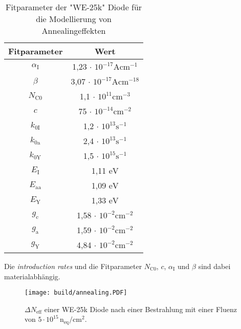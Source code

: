 \begin{table}
  \centering
  \caption{Fitparameter der "WE-25k" Diode für die Modellierung von Annealingeffekten }
  \label{tab:w1}
  \begin{tabular}{c c}
    \toprule
    Fitparameter & Wert  \\
    \midrule
        $\alpha_{\mathrm{I}}$  &    1,23 $\cdot$ $  10^{-17}        \mathrm{Acm^{-1}}$    \\
        $\beta $               &    3,07 $\cdot$ $10^{-17}          \mathrm{Acm^{-18}}$     \\
        $N_{\mathrm{C0}}$             &    1,1  $\cdot$            $10^{11}\mathrm{cm^{-3}}$   \\
        $c$                          &    75   $\cdot$             $10^{-14}\mathrm{cm^{-2}}$    \\
        $k_{0\mathrm{I}}$            &    1,2  $\cdot$             $10^{13}\mathrm{s^{-1}}$\\
        $k_{0\mathrm{a}}$           &    2,4  $\cdot$              $10^{13}\mathrm{s^{-1}}$   \\
        $k_{0\mathrm{Y}}$            &    1,5  $\cdot$             $10^{15}\mathrm{s^{-1}}$     \\
        $E_{\mathrm{I}}$                       &    1,11           $\mathrm{eV}$       \\
        $E_{\mathrm{aa}}$                     &    1,09            $\mathrm{eV}$       \\
        $E_{\mathrm{Y}}$                      &    1,33            $\mathrm{eV}$    \\
        $g_{\mathrm{c}}$      &    1,58 $\cdot$                    $10^{-2}\mathrm{cm^{-2}}$           \\
        $g_{\mathrm{a}}$           &    1,59 $\cdot$               $10^{-2}\mathrm{cm^{-2}}$         \\
        $g_{\mathrm{Y}}$          &    4,84 $\cdot$                $10^{-2}\mathrm{cm^{-2}}$      \\
    \bottomrule
  \end{tabular}
\end{table}
Die \textit{introduction rates} und die Fitparameter $N_{\mathrm{C0}}$, $c$, $\alpha_{\mathrm{I}}$ und $\beta $ sind dabei materialabhängig.

\begin{figure}
  \centering
    \texttt{[image: build/annealing.PDF]}
    \caption{$\Delta N_{\mathrm{eff}}$ einer WE-25k Diode nach einer Bestrahlung mit einer Fluenz von
    $5\cdot 10^{15} \, \mathrm{n_{\mathrm{eq}}/cm^2}$.}
    \label{fig:N_eff}
\end{figure}

